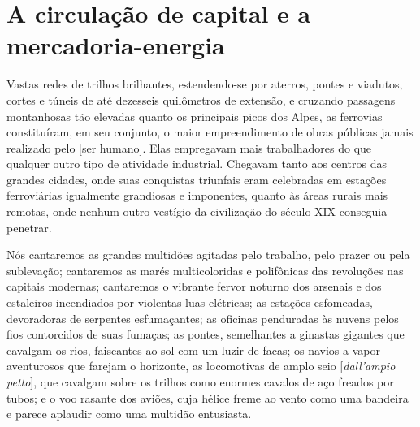 \chapter{A circulação de capital e a mercadoria-energia}

\setlength{\epigraphwidth}{0.7\textwidth}

\epigraph{Vastas redes de trilhos brilhantes, estendendo-se por aterros, pontes e viadutos, cortes e túneis de até dezesseis quilômetros de extensão, e cruzando passagens montanhosas tão elevadas quanto os principais picos dos Alpes, as ferrovias constituíram, em seu conjunto, o maior empreendimento de obras públicas jamais realizado pelo [ser humano]. Elas empregavam mais trabalhadores do que qualquer outro tipo de atividade industrial. Chegavam tanto aos centros das grandes cidades, onde suas conquistas triunfais eram celebradas em estações ferroviárias igualmente grandiosas e imponentes, quanto às áreas rurais mais remotas, onde nenhum outro vestígio da civilização do século XIX conseguia penetrar.}{\textcite[p. 27]{Hobsbawm1987}}

\epigraph{Nós cantaremos as grandes multidões agitadas pelo trabalho, pelo prazer ou pela sublevação; cantaremos as marés multicoloridas e polifônicas das revoluções nas capitais modernas; cantaremos o vibrante fervor noturno dos arsenais e dos estaleiros incendiados por violentas luas elétricas; as estações esfomeadas, devoradoras de serpentes esfumaçantes; as oficinas penduradas às nuvens pelos fios contorcidos de suas fumaças; as pontes, semelhantes a ginastas gigantes que cavalgam os rios, faiscantes ao sol com um luzir de facas; os navios a vapor aventurosos que farejam o horizonte, as locomotivas de amplo seio [\textit{dall'ampio petto}], que cavalgam sobre os trilhos como enormes cavalos de aço freados por tubos; e o voo rasante dos aviões, cuja hélice freme ao vento como uma bandeira e parece aplaudir como uma multidão entusiasta.}{\textcite{Marinetti1909}}




